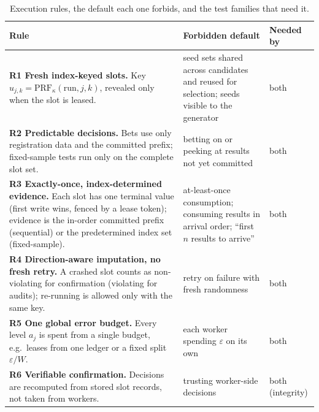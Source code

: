 \documentclass[pdflatex,sn-mathphys-num]{sn-jnl}
\theoremstyle{thmstyleone}
\theoremstyle{thmstyletwo}
\theoremstyle{thmstylethree}
\begin{document}
\begin{table}[!htbp]\centering\small
\caption{Execution rules, the default each one forbids, and the test families that need it.}\label{tab:rules}
\renewcommand{\arraystretch}{1.25}
\begin{tabularx}{\linewidth}{>{\raggedright}X>{\raggedright}p{4.6cm}>{\raggedright\arraybackslash}p{1.7cm}}
\toprule
Rule & Forbidden default & Needed by \\\midrule
\textbf{R1 Fresh index-keyed slots.} Key $u_{j,k}=\mathrm{PRF}_\kappa(\text{run},j,k)$, revealed only when the slot is leased. & seed sets shared across candidates and reused for selection; seeds visible to the generator & both \\
\textbf{R2 Predictable decisions.} Bets use only registration data and the committed prefix; fixed-sample tests run only on the complete slot set. & betting on or peeking at results not yet committed & both \\
\textbf{R3 Exactly-once, index-determined evidence.} Each slot has one terminal value (first write wins, fenced by a lease token); evidence is the in-order committed prefix (sequential) or the predetermined index set (fixed-sample). & at-least-once consumption; consuming results in arrival order; ``first $n$ results to arrive'' & both \\
\textbf{R4 Direction-aware imputation, no fresh retry.} A crashed slot counts as non-violating for confirmation (violating for audits); re-running is allowed only with the same key. & retry on failure with fresh randomness & both \\
\textbf{R5 One global error budget.} Every level $a_j$ is spent from a single budget, e.g.\ leases from one ledger or a fixed split $\varepsilon/W$. & each worker spending $\varepsilon$ on its own & both \\
\textbf{R6 Verifiable confirmation.} Decisions are recomputed from stored slot records, not taken from workers. & trusting worker-side decisions & both (integrity) \\
\bottomrule\end{tabularx}
\end{table}
\end{document}
